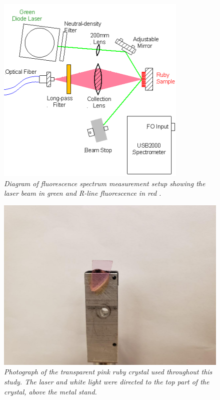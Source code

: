 \documentclass[11pt, a4paper, twocolumn]{article}
\begin{document}
\begin{figure}
\includegraphics[width=\linewidth]{laserBenchDiagram.png}
\caption{\textit{Diagram of fluorescence spectrum measurement setup showing the laser beam in green and R-line fluorescence in red \cite{Heiman}.}}
\label{fig:laserBenchDiagram}
\end{figure}

\begin{figure} %
\includegraphics[width=\linewidth]{rubyPhoto.png}
\caption{\textit{Photograph of the transparent pink ruby crystal used throughout this study. The laser and white light were directed to the top part of the crystal, above the metal stand.}}
\label{fig:rubyPhoto}
\end{figure}
\end{document}
